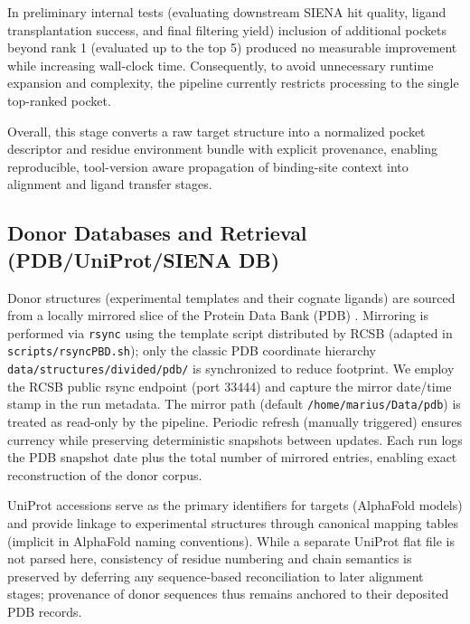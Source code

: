 In preliminary internal tests (evaluating downstream SIENA hit quality, ligand transplantation success, and final filtering yield) inclusion of additional pockets beyond rank 1 (evaluated up to the top 5) produced no measurable improvement while increasing wall-clock time. Consequently, to avoid unnecessary runtime expansion and complexity, the pipeline currently restricts processing to the single top-ranked pocket.

Overall, this stage converts a raw target structure into a normalized pocket descriptor and residue environment bundle with explicit provenance, enabling reproducible, tool-version aware propagation of binding-site context into alignment and ligand transfer stages.

\subsection{Donor Databases and Retrieval (PDB/UniProt/SIENA DB)}
Donor structures (experimental templates and their cognate ligands) are sourced from a locally mirrored slice of the Protein Data Bank (PDB) \cite{burleyRCSBProteinData2019}. Mirroring is performed via \texttt{rsync} using the template script distributed by RCSB (adapted in \texttt{scripts/rsyncPBD.sh}); only the classic PDB coordinate hierarchy \texttt{data/structures/divided/pdb/} is synchronized to reduce footprint. We employ the RCSB public rsync endpoint (port 33444) and capture the mirror date/time stamp in the run metadata. The mirror path (default \texttt{/home/marius/Data/pdb}) is treated as read-only by the pipeline. Periodic refresh (manually triggered) ensures currency while preserving deterministic snapshots between updates. Each run logs the PDB snapshot date plus the total number of mirrored entries, enabling exact reconstruction of the donor corpus.

UniProt accessions serve as the primary identifiers for targets (AlphaFold models) and provide linkage to experimental structures through canonical mapping tables (implicit in AlphaFold naming conventions). While a separate UniProt flat file is not parsed here, consistency of residue numbering and chain semantics is preserved by deferring any sequence-based reconciliation to later alignment stages; provenance of donor sequences thus remains anchored to their deposited PDB records.


